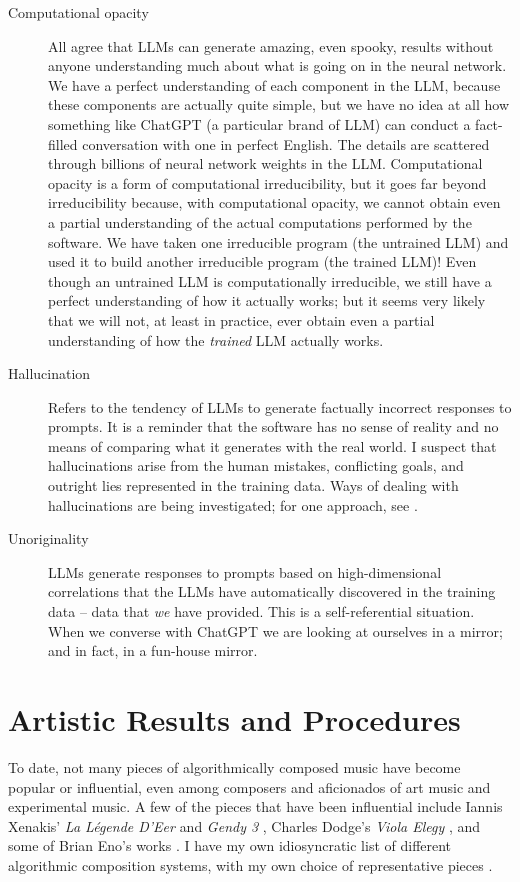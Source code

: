 \documentclass[11pt]{scrartcl}
\begin{document}
\begin{description}
\item[Computational opacity] All agree that LLMs can generate amazing, even spooky, results without anyone understanding much about what is going on in the neural network. We have a perfect understanding of each component in the LLM, because these components are actually quite simple, but we have no idea at all how something like ChatGPT (a particular brand of LLM) can conduct a fact-filled conversation with one in perfect English. The details are scattered through billions of neural network weights in the LLM. Computational opacity is a form of computational irreducibility, but it goes far beyond irreducibility because, with computational opacity, we cannot obtain even a partial understanding of the actual computations performed by the software. We have taken one irreducible program (the untrained LLM) and used it to build another irreducible program (the trained LLM)! Even though an untrained LLM is computationally irreducible, we still have a perfect understanding of how it actually works; but it seems very likely that we will not, at least in practice, ever obtain even a partial understanding of how the \emph{trained} LLM actually works.
\item [Hallucination] Refers to the tendency of LLMs to generate factually incorrect responses to prompts. It is a reminder that the software has no sense of reality and no means of comparing what it generates with the real world. I suspect that hallucinations arise from the human mistakes, conflicting goals, and outright lies represented in the training data. Ways of dealing with hallucinations are being investigated; for one approach, see \parencite{christiano2017deep}.
\item [Unoriginality] LLMs generate responses to prompts based on high-dimensional correlations that the LLMs have automatically discovered in the training data -- data that \emph{we} have provided. This is a self-referential situation. When we converse with ChatGPT we are looking at ourselves in a mirror; and in fact, in a fun-house mirror.
\end{description}

\section*{Artistic Results and Procedures}

To date, not many pieces of algorithmically composed music have become popular or influential, even among composers and aficionados of art music and experimental music. A few of the pieces that have been influential include Iannis Xenakis' \emph{La Légende D'Eer} \parencite{Solr-8143160} and \emph{Gendy 3} \parencite{gendy3},  Charles Dodge's \emph{Viola Elegy} \parencite{violaelegy}, and some of Brian Eno's works \parencite{eno1996generative, enochilvers}. I have my own idiosyncratic list of different algorithmic composition systems, with my own choice of representative pieces \parencite{rant}.
\end{document}
